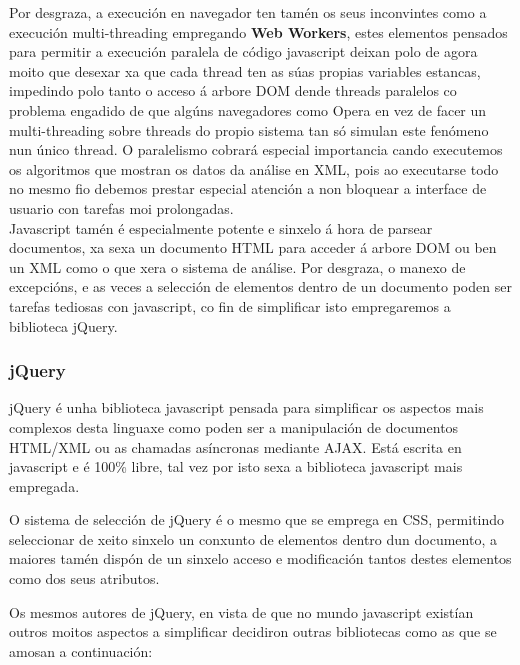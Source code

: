         Por desgraza, a execución en navegador ten tamén os seus inconvintes como a execución 
        multi-threading empregando \textbf{Web Workers}, estes elementos pensados para permitir
        a execución paralela de código javascript deixan polo de agora moito que desexar xa que 
        cada thread ten as súas propias variables estancas, impedindo polo tanto o acceso á 
        arbore DOM dende threads paralelos co problema engadido de que algúns navegadores como 
        Opera en vez de facer un multi-threading sobre threads do propio sistema  tan só simulan
        este fenómeno nun único thread. O paralelismo cobrará especial importancia 
        cando executemos os algoritmos que mostran os datos da análise en XML, pois ao 
        executarse todo no mesmo fio debemos prestar especial atención a non bloquear a 
        interface de usuario con tarefas moi prolongadas.\\
    
        Javascript tamén é especialmente potente e sinxelo á hora de parsear documentos, xa sexa
        un documento HTML para acceder á arbore DOM ou ben un XML como o que xera o sistema de 
        análise. Por desgraza, o manexo de excepcións, e as veces a selección de elementos dentro de un 
        documento poden ser tarefas tediosas con javascript, co fin de simplificar isto empregaremos
        a biblioteca jQuery.
            
        \subsubsection{jQuery}
        
            jQuery é unha biblioteca javascript pensada para simplificar os aspectos mais complexos desta 
            linguaxe como poden ser a manipulación de documentos HTML/XML ou as chamadas asíncronas 
            mediante AJAX. Está escrita en javascript e é 100\% libre, tal vez por isto sexa a biblioteca
            javascript mais empregada.
            
            O sistema de selección de jQuery é o mesmo que se emprega en CSS, permitindo seleccionar de 
            xeito sinxelo un conxunto de elementos dentro dun documento, a maiores tamén dispón de un 
            sinxelo acceso e modificación tantos destes elementos como dos seus atributos.
            
            Os mesmos autores de jQuery, en vista de que no mundo javascript existían outros moitos
            aspectos a simplificar decidiron outras bibliotecas como as que se amosan a continuación:
            
